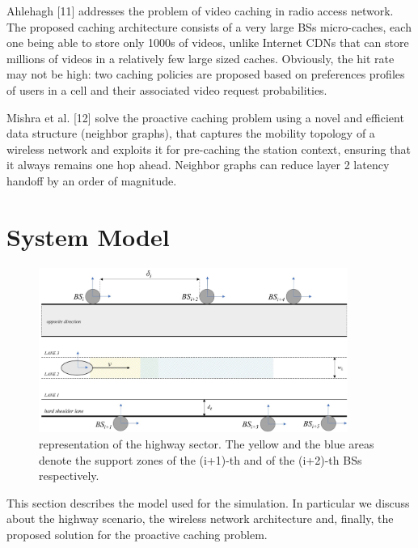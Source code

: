 \documentclass[conference,10pt]{IEEEtran}
\begin{document}
Ahlehagh [11] addresses the problem of video caching in radio access network. The proposed caching architecture consists of a very large BSs micro-caches, each one being able to store only 1000s of videos, unlike Internet CDNs that can store millions of videos in a relatively few large sized caches. Obviously, the hit rate may not be high: two caching policies are proposed based on preferences profiles of users in a cell and their associated video request probabilities.

Mishra et al. [12] solve the proactive caching problem using a novel and efficient data structure (neighbor graphs), that captures the mobility topology of a wireless network and exploits it for pre-caching the station context, ensuring that it always remains one hop ahead. Neighbor graphs can reduce layer 2 latency handoff by an order of magnitude.



\section{System Model}\label{sec:symo}

\begin{figure}
	\centering
	\includegraphics[width=0.9\textwidth]{highway1.jpg}
	\caption{representation of the highway sector. The yellow and the blue areas denote the support zones of the (i+1)-th and of the (i+2)-th BSs respectively.}
	\label{fig:highway_sector}
\end{figure}

This section describes the model used for the simulation. In particular we discuss about the highway scenario, the wireless network architecture and, finally, the proposed solution for the proactive caching problem.
\end{document}
